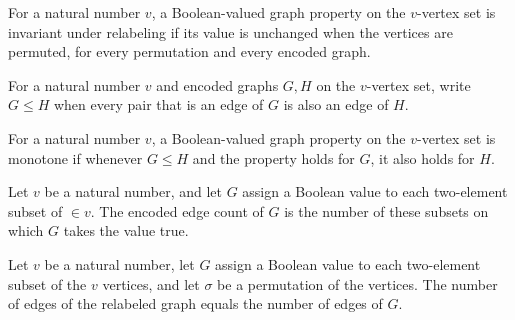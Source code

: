 \begin{definition}
\label{FABL.IsGraphProperty}
\leanok
{}
For a natural number $v$, a Boolean-valued graph property on the $v$-vertex set is
invariant under relabeling if its value is unchanged when the vertices are permuted, for
every permutation and every encoded graph.
\end{definition}

\begin{definition}
\label{FABL.EncodedGraphLE}
\leanok
{}
For a natural number $v$ and encoded graphs $G,H$ on the $v$-vertex set, write $G\le H$
when every pair that is an edge of $G$ is also an edge of $H$.
\end{definition}

\begin{definition}
\label{FABL.IsMonotoneGraphProperty}
\leanok
{}
For a natural number $v$, a Boolean-valued graph property on the $v$-vertex set is
monotone if whenever $G\le H$ and the property holds for $G$, it also holds for $H$.
\end{definition}

\begin{definition}
\label{FABL.encodedGraphEdgeCount}
\leanok
{}
Let $v$ be a natural number, and let $G$ assign a Boolean value to each two-element
subset of $\in{v}$. The encoded edge count of $G$ is the number of these subsets on
which $G$ takes the value true.
\end{definition}

\begin{theorem}
\label{FABL.encodedGraphEdgeCount_permute}
\leanok
{}
Let $v$ be a natural number, let $G$ assign a Boolean value to each two-element subset
of the $v$ vertices, and let $\sigma$ be a permutation of the vertices. The number of
edges of the relabeled graph equals the number of edges of $G$.
\end{theorem}

